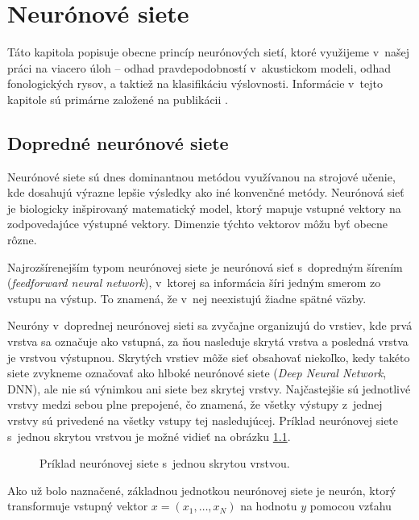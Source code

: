 \chapter{Neurónové siete} \label{cha:neural-networks}

Táto kapitola popisuje obecne princíp neurónových sietí, ktoré využijeme v~našej práci na viacero úloh -- odhad pravdepodobností v~akustickom modeli, odhad fonologických rysov, a taktiež na klasifikáciu výslovnosti. Informácie v~tejto kapitole sú primárne založené na publikácii \cite{Bishop2006}. 

\section{Dopredné neurónové siete}

Neurónové siete sú dnes dominantnou metódou využívanou na strojové učenie, kde dosahujú výrazne lepšie výsledky ako iné konvenčné metódy. Neurónová sieť je biologicky inšpirovaný matematický model, ktorý mapuje vstupné vektory na zodpovedajúce výstupné vektory. Dimenzie týchto vektorov môžu byť obecne rôzne. 

Najrozšírenejším typom neurónovej siete je neurónová sieť s~dopredným šírením (\textit{feedforward neural network}), v~ktorej sa informácia šíri jedným smerom zo vstupu na výstup. To znamená, že v~nej neexistujú žiadne spätné väzby. 

Neuróny v~doprednej neurónovej sieti sa zvyčajne organizujú do vrstiev, kde prvá vrstva sa označuje ako vstupná, za ňou nasleduje skrytá vrstva a posledná vrstva je vrstvou výstupnou. Skrytých vrstiev môže sieť obsahovať niekoľko, kedy takéto siete zvykneme označovať ako hlboké neurónové siete (\textit{Deep Neural Network}, DNN), ale nie sú výnimkou ani siete bez skrytej vrstvy. Najčastejšie sú jednotlivé vrstvy medzi sebou plne prepojené, čo znamená, že všetky výstupy z~jednej vrstvy sú privedené na všetky vstupy tej nasledujúcej. Príklad neurónovej siete s~jednou skrytou vrstvou je možné vidieť na obrázku \ref{fig:nn}.

\begin{figure}[!ht]
    \centering
    
    \caption{Príklad neurónovej siete s~jednou skrytou vrstvou.}
    \label{fig:nn}
\end{figure}

Ako už bolo naznačené, základnou jednotkou neurónovej siete je neurón, ktorý transformuje vstupný vektor $x = (x_1, \dots, x_N)$ na hodnotu $y$ pomocou vzťahu


